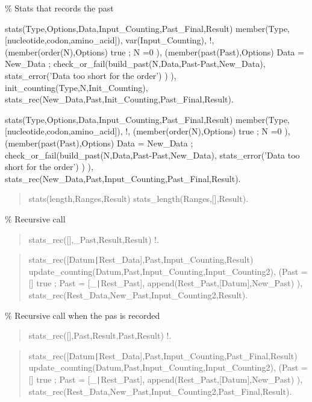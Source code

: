 \% Stats that records the past

\begin{center}
stats(Type,Options,Data,Input_Counting,Past_Final,Result) \Sneck{}
member(Type,[nucleotide,codon,amino_acid]),
var(Input_Counting),
!,
(member(order(N),Options) \Sifthen{}
true
;
N =0
),
(member(past(Past),Options) \Sifthen{}
Data = New_Data
;
check_or_fail(build_past(N,Data,Past-Past,New_Data),
stats_error('Data too short for the order')
)
),
init_counting(Type,N,Init_Counting),
stats_rec(New_Data,Past,Init_Counting,Past_Final,Result).
\end{center}

\begin{center}
stats(Type,Options,Data,Input_Counting,Past_Final,Result) \Sneck{}
member(Type,[nucleotide,codon,amino_acid]),
!,
(member(order(N),Options) \Sifthen{}
true
;
N =0
),
(member(past(Past),Options) \Sifthen{}
Data = New_Data
;
check_or_fail(build_past(N,Data,Past-Past,New_Data),
stats_error('Data too short for the order')
)
),
stats_rec(New_Data,Past,Input_Counting,Past_Final,Result).
\end{center}

\begin{quote}
stats(length,Ranges,Result) \Sneck{}
stats_length(Ranges,[],Result).
\end{quote}

\% Recursive call

\begin{quote}
stats_rec([],_Past,Result,Result) \Sneck{}
!.
\end{quote}

\begin{quote}
stats_rec([Datum{\tt\string|}Rest_Data],Past,Input_Counting,Result) \Sneck{}
update_counting(Datum,Past,Input_Counting,Input_Counting2),
(Past = [] \Sifthen{}
true
;
Past = [_{\tt\string|}Rest_Past],
append(Rest_Past,[Datum],New_Past)
),
stats_rec(Rest_Data,New_Past,Input_Counting2,Result).
\end{quote}

\% Recursive call when the pas is recorded

\begin{quote}
stats_rec([],Past,Result,Past,Result) \Sneck{}
!.
\end{quote}

\begin{quote}
stats_rec([Datum{\tt\string|}Rest_Data],Past,Input_Counting,Past_Final,Result) \Sneck{}
update_counting(Datum,Past,Input_Counting,Input_Counting2),
(Past = [] \Sifthen{}
true
;
Past = [_{\tt\string|}Rest_Past],
append(Rest_Past,[Datum],New_Past)
),
stats_rec(Rest_Data,New_Past,Input_Counting2,Past_Final,Result).
\end{quote}

